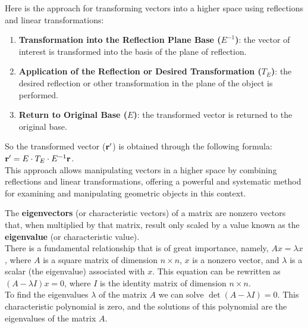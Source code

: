 \null\newpage

\thispagestyle{empty}

\begin{minipage}{0.48\textwidth}
	
	Here is the approach for transforming vectors into a higher space using reflections and linear transformations:
	\begin{enumerate}[topsep=2.5pt]
		\item \textbf{Transformation into the Reflection Plane Base ($E^{-1}$)}: the vector of interest is transformed into the basis of the plane of reflection.
		\item \textbf{Application of the Reflection or Desired Transformation ($T_E$)}: the desired reflection or other transformation in the plane of the object is performed.
		\item \textbf{Return to Original Base ($E$)}: the transformed vector is returned to the original base.
	\end{enumerate}
	So the transformed vector ($\mathbf{r}'$) is obtained through the following formula: $\mathbf{r}' = E \cdot T_E \cdot E^{-1} \mathbf{r}$. \\
	
	This approach allows manipulating vectors in a higher space by combining reflections and linear transformations, offering a powerful and systematic method for examining and manipulating geometric objects in this context.
	
	\vspace{0.5cm}
	
	\topic[Eigenstuff]
	The \textbf{eigenvectors} (or characteristic vectors) of a matrix are nonzero vectors that, when multiplied by that matrix, result only scaled by a value known as the \textbf{eigenvalue} (or characteristic value). \\
	
	There is a fundamental relationship that is of great importance, namely, $A x=\lambda x$, where $A$ is a square matrix of dimension $n \times n$, $x$ is a nonzero vector, and $\lambda$ is a scalar (the eigenvalue) associated with $x$. This equation can be rewritten as $(A-\lambda I)x=0$, where $I$ is the identity matrix of dimension $n \times n$. \\
	
	To find the eigenvalues $\lambda$ of the matrix $A$ we can solve $\det(A-\lambda I)=0$. This characteristic polynomial is zero, and the solutions of this polynomial are the eigenvalues of the matrix $A$. \\
	

\end{minipage}
